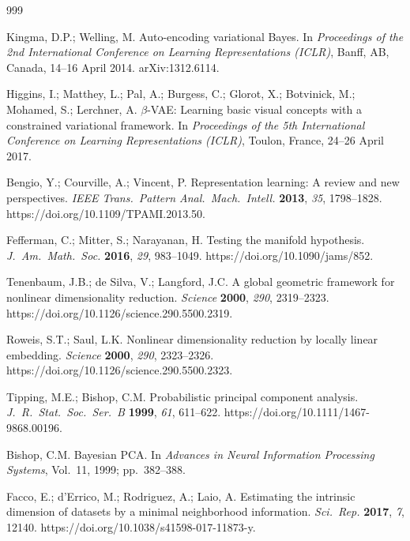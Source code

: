 \documentclass[make,article,submit,pdftex,moreauthors]{Definitions/mdpi}
\begin{document}
\begin{thebibliography}{999}

Kingma, D.P.; Welling, M.
Auto-encoding variational Bayes.
In \textit{Proceedings of the 2nd International Conference on Learning
Representations (ICLR)}, Banff, AB, Canada, 14--16 April 2014.
arXiv:1312.6114.

Higgins, I.; Matthey, L.; Pal, A.; Burgess, C.; Glorot, X.; Botvinick, M.;
Mohamed, S.; Lerchner, A.
$\beta$-VAE: Learning basic visual concepts with a constrained variational
framework.
In \textit{Proceedings of the 5th International Conference on Learning
Representations (ICLR)}, Toulon, France, 24--26 April 2017.

Bengio, Y.; Courville, A.; Vincent, P.
Representation learning: A review and new perspectives.
\textit{IEEE Trans.\ Pattern Anal.\ Mach.\ Intell.} \textbf{2013},
\textit{35}, 1798--1828. https://doi.org/10.1109/TPAMI.2013.50.

Fefferman, C.; Mitter, S.; Narayanan, H.
Testing the manifold hypothesis.
\textit{J.\ Am.\ Math.\ Soc.} \textbf{2016}, \textit{29}, 983--1049.
https://doi.org/10.1090/jams/852.

Tenenbaum, J.B.; de Silva, V.; Langford, J.C.
A global geometric framework for nonlinear dimensionality reduction.
\textit{Science} \textbf{2000}, \textit{290}, 2319--2323.
https://doi.org/10.1126/science.290.5500.2319.

Roweis, S.T.; Saul, L.K.
Nonlinear dimensionality reduction by locally linear embedding.
\textit{Science} \textbf{2000}, \textit{290}, 2323--2326.
https://doi.org/10.1126/science.290.5500.2323.

Tipping, M.E.; Bishop, C.M.
Probabilistic principal component analysis.
\textit{J.\ R.\ Stat.\ Soc.\ Ser.\ B} \textbf{1999}, \textit{61}, 611--622.
https://doi.org/10.1111/1467-9868.00196.

Bishop, C.M.
Bayesian PCA.
In \textit{Advances in Neural Information Processing Systems}, Vol.~11,
1999; pp.~382--388.

Facco, E.; d'Errico, M.; Rodriguez, A.; Laio, A.
Estimating the intrinsic dimension of datasets by a minimal neighborhood
information.
\textit{Sci.\ Rep.} \textbf{2017}, \textit{7}, 12140.
https://doi.org/10.1038/s41598-017-11873-y.


\end{thebibliography}
\end{document}
